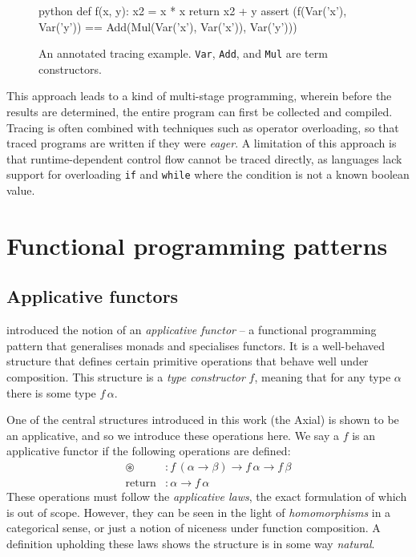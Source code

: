 \begin{figure}[ht]
    \centering
    \begin{cminted}{python}
def f(x, y):
    x2 = x * x
    return x2 + y
assert (f(Var('x'), Var('y')) 
        == Add(Mul(Var('x'), Var('x')), Var('y')))
    \end{cminted}
    \caption{An annotated tracing example. \texttt{Var}, \texttt{Add}, and \texttt{Mul} are term constructors.}
    \label{fig:tracing}
\end{figure}

This approach leads to a kind of multi-stage programming, wherein before the results are determined, the entire program can first be collected and compiled. Tracing is often combined with techniques such as operator overloading, so that traced programs are written if they were \textit{eager}. A limitation of this approach is that runtime-dependent control flow cannot be traced directly, as languages lack support for overloading \texttt{if} and \texttt{while} where the condition is not a known boolean value.

\section{Functional programming patterns}
\label{functional-programming-patterns}

\subsection{Applicative functors}

\textcite{mcbride2008applicative} introduced the notion of an \textit{applicative functor} -- a functional programming pattern that generalises monads and specialises functors. It is a well-behaved structure that defines certain primitive operations that behave well under composition. This structure is a \textit{type constructor} $f$, meaning that for any type $\alpha$ there is some type $f\,\alpha$.

One of the central structures introduced in this work (the Axial) is shown to be an applicative, and so we introduce these operations here. We say a $f$ is an applicative functor if the following operations are defined:
\begin{align*}
\circledast &: f\,(\alpha \to \beta) \to f\,\alpha \to f\,\beta \\
\mathrm{return} &: \alpha \to f\,\alpha
\end{align*}
These operations must follow the \textit{applicative laws}, the exact formulation of which is out of scope. However, they can be seen in the light of \textit{homomorphisms} in a categorical sense, or just a notion of niceness under function composition. A definition upholding these laws shows the structure is in some way \textit{natural}. 

